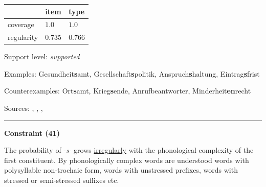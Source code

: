 \begin{table}[!ht]
\begin{center}

\begin{tabularx}{\columnwidth}{|X|X|X|}
\hline
 & item & type \\
\hline
 coverage & $1.0$ & $1.0$ \\
\hline
 regularity & $0.735$ & $0.766$ \\
\hline
\end{tabularx}
\end{center}
\end{table}

\vspace{-1.35em}

\noindent
Support level: \textit{supported}

\vspace{0.3em}

\noindent
Examples: Gesundheit\textbf{s}amt, Gesellschaft\textbf{s}politik, Anspruch\textbf{s}haltung, Eintrag\textbf{s}frist

\noindent
Counterexamples: Ort\textbf{s}amt, Krieg\textbf{s}ende, Anruf{\zeroLinker}beantworter, Minderheit\textbf{en}recht

\vspace{0.3em}

\noindent
Sources: \citet[572]{fuhrhop_kuerschner_2015}, \citet[201]{kopf_2017}, \citet[106, 111, 112]{kuerschner_2005}, \citet[19, 22]{kuerschner_2010}


\hrule




\vspace{0.4em}

\begin{center}
\textbf{Constraint (41)}
\end{center}

\noindent
The probability of -\textit{s}- grows \underline{irregularly} with the phonological complexity of the first constituent. By phonologically complex words are understood words with polysyllable non-trochaic form, words with unstressed prefixes, words with stressed or semi-stressed suffixes etc.

\newpage

\vspace{0.35em}


